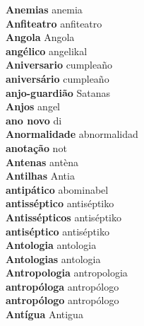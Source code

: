 \textbf{ Anemias  } anemia \\
\textbf{ Anfiteatro  } anfiteatro \\
\textbf{ Angola  } Angola \\
\textbf{ angélico  } angelikal \\
\textbf{ Aniversario  } cumpleaño \\
\textbf{ aniversário  } cumpleaño \\
\textbf{ anjo-guardião  } Satanas \\
\textbf{ Anjos  } angel \\
\textbf{ ano novo  } di \\
\textbf{ Anormalidade  } abnormalidad \\
\textbf{ anotação  } not \\
\textbf{ Antenas  } antèna \\
\textbf{ Antilhas  } Antia \\
\textbf{ antipático  } abominabel \\
\textbf{ antisséptico  } antiséptiko \\
\textbf{ Antissépticos  } antiséptiko \\
\textbf{ antiséptico  } antiséptiko \\
\textbf{ Antologia  } antologia \\
\textbf{ Antologias  } antologia \\
\textbf{ Antropologia  } antropologia \\
\textbf{ antropóloga  } antropólogo \\
\textbf{ antropólogo  } antropólogo \\
\textbf{ Antígua  } Antigua \\
